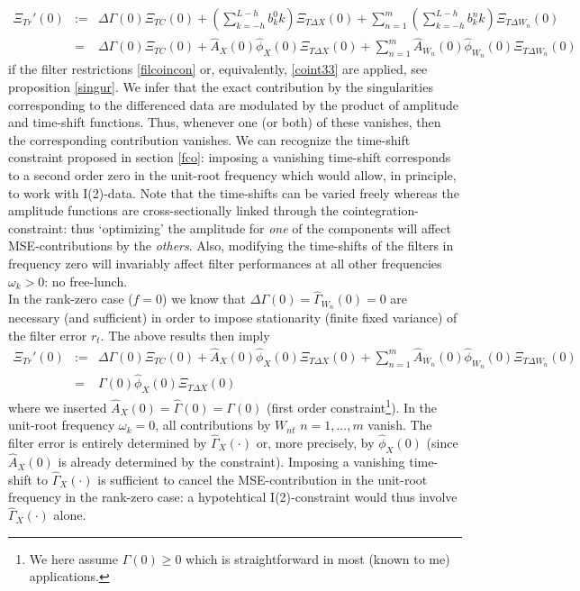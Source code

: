 \documentclass[11pt]{article}
\begin{document}
\begin{eqnarray}
\Xi_{Tr}'(0)&:=& \Delta\Gamma(0)\Xi_{TC}(0)+\left(\sum_{k=-h}^{L-h} b_k^0k\right)\Xi_{T\Delta X}(0)+\sum_{n=1}^m\left(\sum_{k=-h}^{L-h} b_k^nk\right)\Xi_{T\Delta W_n}(0)\nonumber\\
&=&\Delta\Gamma(0)\Xi_{TC}(0)+\hat{A}_X(0)\hat{\phi}_X(0)\Xi_{T\Delta X}(0)+\sum_{n=1}^m\hat{A}_{W_n}(0)\hat{\phi}_{W_n}(0)\Xi_{T\Delta W_n}(0)\nonumber
\end{eqnarray}
if the filter restrictions \ref{filcoincon} or, equivalently, \ref{coint33} are applied, see proposition \ref{singur}. We infer that the exact contribution by the singularities corresponding to the differenced data are modulated by the product of amplitude and time-shift functions. Thus, whenever one (or both) of these vanishes, then the corresponding contribution vanishes. We can recognize the time-shift constraint proposed in section \ref{fco}: imposing a vanishing time-shift corresponds to a second order zero in the unit-root frequency which would allow, in principle, to work with I(2)-data. Note that the time-shifts can be varied freely whereas the amplitude functions are cross-sectionally linked through the cointegration-constraint: thus `optimizing' the amplitude for \emph{one} of the components will affect MSE-contributions by the \emph{others}. Also, modifying the time-shifts of the filters in frequency zero will invariably affect filter performances at all other frequencies $\omega_k>0$: no free-lunch.\\

In the  rank-zero case ($f=0$) we know that $\Delta\Gamma(0)=\hat{\Gamma}_{W_n}(0)=0$ are necessary (and sufficient) in order to impose stationarity (finite fixed variance) of the filter error $r_t$. The above results then imply
\begin{eqnarray}
\Xi_{Tr}'(0)&:=& \Delta\Gamma(0)\Xi_{TC}(0)+\hat{A}_X(0)\hat{\phi}_X(0)\Xi_{T\Delta X}(0)+\sum_{n=1}^m\hat{A}_{W_n}(0)\hat{\phi}_{W_n}(0)\Xi_{T\Delta W_n}(0)\nonumber\\
&=&\Gamma(0)\hat{\phi}_X(0)\Xi_{T\Delta X}(0)\nonumber
\end{eqnarray}
where we inserted $\hat{A}_X(0)=\hat{\Gamma}(0)=\Gamma(0)$ (first order constraint\footnote{We here assume $\Gamma(0)\geq 0$ which is straightforward in most (known to me) applications.}). In the unit-root frequency $\omega_k=0$, all contributions by  $W_{nt}$ $n=1,...,m$ vanish. The filter error  is entirely determined by $\hat{\Gamma}_X(\cdot)$ or, more precisely, by $\hat{\phi}_X(0)$ (since $\hat{A}_X(0)$ is already determined by the constraint). Imposing a vanishing time-shift to $\hat{\Gamma}_X(\cdot)$ is sufficient to cancel the MSE-contribution in the unit-root frequency in the rank-zero case:  a hypotehtical I(2)-constraint would thus involve $\hat{\Gamma}_X(\cdot)$ alone.  \\
\end{document}
